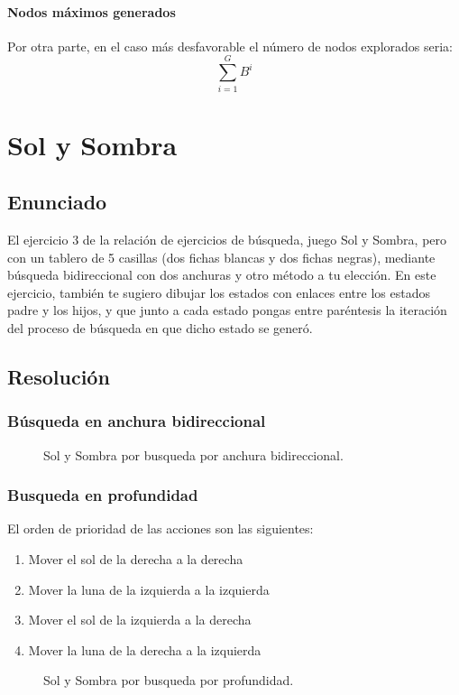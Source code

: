 \documentclass[a4paper,10pt]{article}
\begin{document}
\paragraph{Nodos máximos generados}
Por otra parte, en el caso más desfavorable el número de nodos explorados seria:
\begin{equation}
  \sum^{G}_{i=1}{B^{i}}
\end{equation}
\pagebreak

\section{Sol y Sombra}
\subsection{Enunciado}
El ejercicio 3 de la relación de ejercicios de búsqueda, juego Sol y Sombra, pero con un tablero de 5 casillas (dos fichas blancas y dos fichas negras), mediante búsqueda bidireccional con dos anchuras y otro método a tu elección. En este ejercicio, también te sugiero dibujar los estados con enlaces entre los estados padre y los hijos, y que junto a cada estado pongas entre paréntesis la iteración del proceso de búsqueda en que dicho estado se generó.
\subsection{Resolución}
\subsubsection{Búsqueda en anchura bidireccional}

\begin{figure}[hbt]
  \centering
	\scalebox{0.48}{}
	\caption{Sol y Sombra por busqueda por anchura bidireccional.}
	\label{fig:sol_y_sombra_anchura_bi}
\end{figure}
\pagebreak

\subsubsection{Busqueda en profundidad}
El orden de prioridad de las acciones son las siguientes:
\begin{enumerate}
  \item Mover el sol de la derecha a la derecha
  \item Mover la luna de la izquierda a la izquierda
  \item Mover el sol de la izquierda a la derecha
  \item Mover la luna de la derecha a la izquierda
\end{enumerate}
\begin{figure}[hbt]
  \centering
	\scalebox{0.55}{}
	\caption{Sol y Sombra por busqueda por profundidad.}
	\label{fig:sol_y_sombra_profundidad}
\end{figure}
\end{document}
